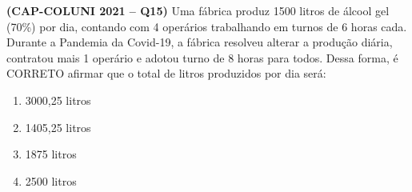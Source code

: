 \textbf{(CAP-COLUNI 2021 -- Q15)} Uma fábrica produz 1500 litros de álcool gel (70\%) por dia, contando com 4 operários trabalhando em turnos de 6 horas cada. Durante a Pandemia da Covid-19, a fábrica resolveu alterar a produção diária, contratou mais 1 operário e adotou turno de 8 horas para todos. Dessa forma, é CORRETO afirmar que o total de litros produzidos por dia será:

\begin{enumerate}
	\item 3000,25 litros
	\item 1405,25 litros
	\item 1875 litros
	\item 2500 litros
\end{enumerate}
